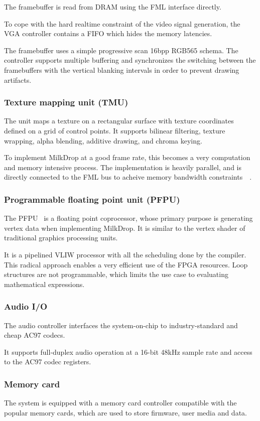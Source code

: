 \documentclass[a4paper,11pt,twocolumn]{paper}
\begin{document}
The framebuffer is read from DRAM using the FML interface directly.

To cope with the hard realtime constraint of the video signal generation, the VGA controller contains a FIFO which hides the memory latencies.

The framebuffer uses a simple progressive scan 16bpp RGB565 schema. The controller supports multiple buffering and synchronizes the switching between the framebuffers with the vertical blanking intervals in order to prevent drawing artifacts.

\subsubsection{Texture mapping unit (TMU)}
The unit maps a texture on a rectangular surface with texture coordinates defined on a grid of control points. It supports bilinear filtering, texture wrapping, alpha blending, additive drawing, and chroma keying.

To implement MilkDrop at a good frame rate, this becomes a very computation and memory intensive process. The implementation is heavily parallel, and is directly connected to the FML bus to acheive memory bandwidth constraints~\cite{confslides}~\cite{tmu}.

\subsubsection{Programmable floating point unit (PFPU)}
The PFPU~\cite{pfpu} is a floating point coprocessor, whose primary purpose is generating vertex data when implementing MilkDrop. It is similar to the vertex shader of traditional graphics processing units.

It is a pipelined VLIW processor with all the scheduling done by the compiler. This radical approach enables a very efficient use of the FPGA resources. Loop structures are not programmable, which limits the use case to evaluating mathematical expressions.

\subsubsection{Audio I/O}
The audio controller interfaces the system-on-chip to industry-standard and cheap AC97 codecs.

It supports full-duplex audio operation at a 16-bit 48kHz sample rate and access to the AC97 codec registers.

\subsubsection{Memory card}
The system is equipped with a memory card controller compatible with the popular memory cards, which are used to store firmware, user media and data.
\end{document}

